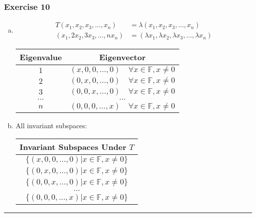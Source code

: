 \documentclass[12pt, letterpaper]{scrartcl}
\newcommand{\F}{\mathbb{F}}
\begin{document}
\subsubsection*{Exercise 10}
\begin{enumerate}[(a)]
    \item 
    \begin{align*}
        T(x_1,x_2,x_3,\dots,x_n)&=\lambda(x_1,x_2,x_3,\dots,x_n)\\
        (x_1,2x_2,3x_3,\dots,nx_n)&=(\lambda x_1,\lambda x_2,\lambda x_3,\dots,\lambda x_n)
    \end{align*}

    \begin{center}
        \begin{tabular}{c | c} 
         \hline
         Eigenvalue & Eigenvector \\
         \hline
         $1$ & $(x, 0, 0, \dots, 0) \quad\forall x\in\F, x\neq0$\\
         $2$ & $(0, x, 0, \dots, 0) \quad\forall x\in\F, x\neq0$\\
         $3$ & $(0, 0, x, \dots, 0) \quad\forall x\in\F, x\neq0$\\
         $\dots$ & $\dots$\\
         $n$ & $(0, 0, 0, \dots, x) \quad\forall x\in\F, x\neq0$\\
         \hline
        \end{tabular}
    \end{center}

    \item 
    All invariant subspaces:
    \begin{center}
        \begin{tabular}{c} 
         \hline
         Invariant Subspaces Under $T$\\
         \hline
         $\{(x, 0, 0, \dots, 0)|x\in\F, x\neq0\}$ \\
         $\{(0, x, 0, \dots, 0)|x\in\F, x\neq0\}$ \\
         $\{(0, 0, x, \dots, 0)|x\in\F, x\neq0\}$ \\
         $\dots$ \\
         $\{(0, 0, 0, \dots, x)|x\in\F, x\neq0\}$ \\
         \hline
        \end{tabular}
    \end{center}
\end{enumerate}

\vskip1mm\hrule
\end{document}
